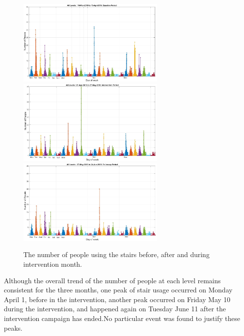 \begin{figure}[!htbp]
\centering
    \includegraphics[width=0.65\textwidth]{image/Chapters/Chapter6/18-Mar-2019Base.jpg}
    \includegraphics[width=0.65\textwidth]{image/Chapters/Chapter6/29-Apr-2019Int.jpg}
    \includegraphics[width=0.65\textwidth]{image/Chapters/Chapter6/27-May-2019Follow.jpg}
    \caption{The number of people using the stairs before, after and during intervention month.}
    \label{3mon}
\end{figure}


Although the overall trend of the number of people at each level remains consistent for the three months, one peak of stair usage occurred on Monday April 1, before in the intervention, another peak occurred on Friday May 10 during the intervention, and happened again on Tuesday June 11 after the intervention campaign has ended.No particular event was found to justify these peaks. 


